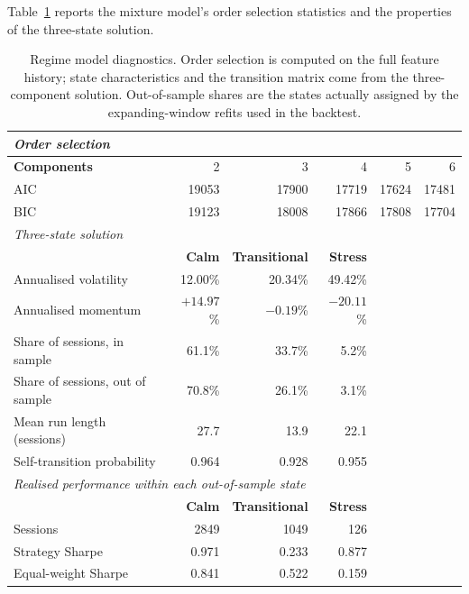 \documentclass{singlecol-new}
\theoremstyle{TH}{
\newtheorem{lemma}{Lemma}
\newtheorem{theorem}[lemma]{Theorem}
\newtheorem{corrolary}[lemma]{Corrolary}
\newtheorem{conjecture}[lemma]{Conjecture}
\newtheorem{proposition}[lemma]{Proposition}
\newtheorem{claim}[lemma]{Claim}
\newtheorem{stheorem}[lemma]{Wrong Theorem}
\newtheorem{algorithm}{Algorithm}
}
\theoremstyle{THrm}{
\newtheorem{definition}{Definition}[section]
\newtheorem{question}{Question}[section]
\newtheorem{remark}{Remark}
\newtheorem{scheme}{Scheme}
}
\theoremstyle{THhit}{
\newtheorem{case}{Case}[section]
}
\begin{document}
Table~\ref{tab:regimefit} reports the mixture model's order selection statistics and the properties of
the three-state solution.

\begin{table}[!ht]
\centering
\caption{Regime model diagnostics. Order selection is computed on the full feature
history; state characteristics and the transition matrix come from the three-component
solution. Out-of-sample shares are the states actually assigned by the expanding-window
refits used in the backtest.}
\label{tab:regimefit}
\small
\begin{tabular}{p{3.2cm}rrrrr}
\hline
\multicolumn{6}{l}{\textit{Order selection}} \\
\hline
\textbf{Components} & 2 & 3 & 4 & 5 & 6 \\
AIC & 19053 & 17900 & 17719 & 17624 & 17481 \\
BIC & 19123 & 18008 & 17866 & 17808 & 17704 \\
\hline
\multicolumn{6}{l}{\textit{Three-state solution}} \\
\hline
& \textbf{Calm} & \textbf{Transitional} & \textbf{Stress} & & \\
Annualised volatility & 12.00\% & 20.34\% & 49.42\% & & \\
Annualised momentum & $+14.97$\% & $-0.19$\% & $-20.11$\% & & \\
Share of sessions, in sample & 61.1\% & 33.7\% & 5.2\% & & \\
Share of sessions, out of sample & 70.8\% & 26.1\% & 3.1\% & & \\
Mean run length (sessions) & 27.7 & 13.9 & 22.1 & & \\
Self-transition probability & 0.964 & 0.928 & 0.955 & & \\
\hline
\multicolumn{6}{l}{\textit{Realised performance within each out-of-sample state}} \\
\hline
& \textbf{Calm} & \textbf{Transitional} & \textbf{Stress} & & \\
Sessions & 2849 & 1049 & 126 & & \\
Strategy Sharpe & 0.971 & 0.233 & 0.877 & & \\
Equal-weight Sharpe & 0.841 & 0.522 & 0.159 & & \\
\hline
\end{tabular}
\end{table}
\end{document}
